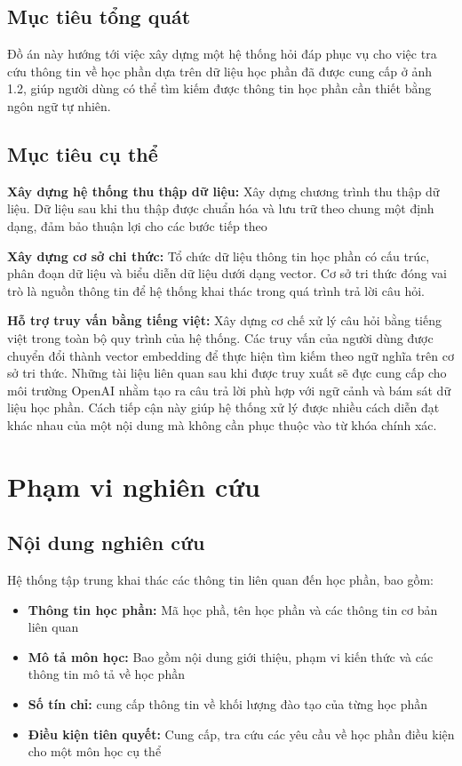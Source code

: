 \documentclass[../DoAn.tex]{subfiles}
\begin{document}
\subsection{Mục tiêu tổng quát}
Đồ án này hướng tới việc xây dựng một hệ thống hỏi đáp phục vụ cho việc tra cứu thông tin về học phần dựa trên dữ liệu học phần đã được cung cấp ở ảnh 1.2, giúp người dùng có thể tìm kiếm được thông tin học phần cần thiết bằng ngôn ngữ tự nhiên.

\subsection{Mục tiêu cụ thể}
\textbf{Xây dựng hệ thống thu thập dữ liệu:} Xây dựng chương trình thu thập dữ liệu. Dữ liệu sau khi thu thập được chuẩn hóa và lưu trữ theo chung một định dạng, đảm bảo thuận lợi cho các bước tiếp theo

\textbf{Xây dựng cơ sở chi thức:} Tổ chức dữ liệu thông tin học phần có cấu trúc, phân đoạn dữ liệu và biểu diễn dữ liệu dưới dạng vector. Cơ sở tri thức đóng vai trò là nguồn thông tin để hệ thống khai thác trong quá trình trả lời câu hỏi.

\textbf{Hỗ trợ truy vấn bằng tiếng việt:} Xây dựng cơ chế xử lý câu hỏi bằng tiếng việt trong toàn bộ quy trình của hệ thống. Các truy vấn của người dùng được chuyển đổi thành vector embedding để thực hiện tìm kiếm theo ngữ nghĩa trên cơ sở tri thức. Những tài liệu liên quan sau khi được truy xuất sẽ đực cung cấp cho môi trường OpenAI nhằm tạo ra câu trả lời phù hợp với ngữ cảnh và bám sát dữ liệu học phần. Cách tiếp cận này giúp hệ thống xử lý được nhiều cách diễn đạt khác nhau của một nội dung mà không cần phục thuộc vào từ khóa chính xác.


\section{Phạm vi nghiên cứu}
\subsection{Nội dung nghiên cứu}
Hệ thống tập trung khai thác các thông tin liên quan đến học phần, bao gồm:
\begin{itemize}
    \item \textbf{Thông tin học phần:} Mã học phầ, tên học phần và các thông tin cơ bản liên quan
    \item  \textbf{Mô tả môn học:} Bao gồm nội dung giới thiệu, phạm vi kiến thức và các thông tin mô tả về học phần
    \item \textbf{Số tín chỉ:} cung cấp thông tin về khối lượng đào tạo của từng học phần
    \item \textbf{Điều kiện tiên quyết:} Cung cấp, tra cứu các yêu cầu về học phần điều kiện cho một môn học cụ thể
\end{itemize}
\end{document}
